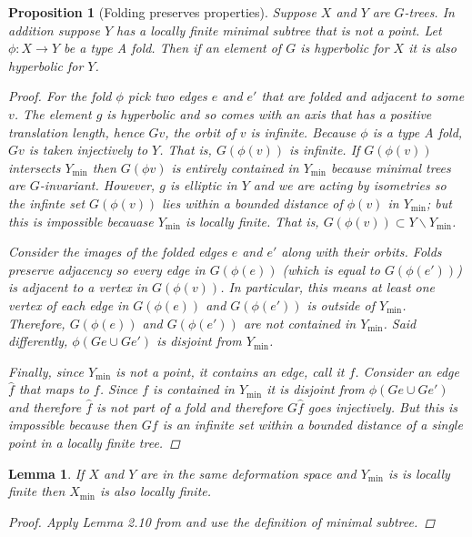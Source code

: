 \documentclass[12pt,parskip=full]{report}
\theoremstyle{plain}
\newtheorem{lem}[thm]{Lemma}
\newtheorem{prop}[thm]{Proposition}
\theoremstyle{definition}
\begin{document}
\begin{prop}
    [Folding preserves properties]
    \label{lem:foldingpreserveshyp}
    Suppose $X$ and $Y$ are $G$-trees. In addition suppose $Y$ has a locally finite minimal subtree that is not a point. Let $\phi:X\to Y$ be a type A fold. Then if an element of $G$ is hyperbolic for $X$ it is also hyperbolic for $Y$.
    
    \begin{proof}
        For the fold $\phi$ pick two edges $e$ and $e'$ that are folded and adjacent to some $v$. The element $g$ is hyperbolic and so comes with an axis that has a positive translation length, hence $Gv$, the orbit of $v$ is infinite. Because $\phi$ is a type A fold, $G v$ is taken injectively to $Y$. That is, $G(\phi (v))$ is infinite. If $G(\phi (v))$ intersects $Y_\text{min}$ then $G(\phi v)$ is entirely contained in $Y_\text{min}$ because minimal trees are $G$-invariant. However, $g$ is elliptic in $Y$ and we are acting by isometries so the infinte set $G(\phi (v))$ lies within a bounded distance of $\phi (v)$ in $Y_\text{min}$; but this is impossible becauase $Y_\text{min}$ is locally finite. That is, $G(\phi (v))\subset Y\smallsetminus Y_\text{min}$. 
        
        Consider the images of the folded edges $e$ and $e'$ along with their orbits. 
        Folds preserve adjacency so every edge in $G(\phi (e))$ (which is equal to $G(\phi (e'))$) is adjacent to a vertex in $G( \phi (v))$. In particular, this means at least one vertex of each edge in $G(\phi (e))$ and $G(\phi (e'))$ is outside of $Y_\text{min}$. 
        Therefore, $G(\phi (e))$ and $G(\phi (e'))$ are not contained in $Y_\text{min}$. 
        Said differently, $\phi( Ge\cup Ge')$ is disjoint from $Y_\text{min}$.
        
        Finally, since $Y_\text{min}$ is not a point, it contains an edge, call it $f$. Consider an edge $\hat{f}$ that maps to $f$. Since $f$ is contained in $Y_\text{min}$ it is disjoint from $\phi( Ge\cup Ge')$ and therefore $\hat{f}$ is not part of a fold and therefore \(G\hat{f}\) goes injectively. But this is impossible because then $Gf$ is an infinite set within a bounded distance of a single point in a locally finite tree.
    \end{proof}
\end{prop}

\begin{lem}
    \label{lem:pullbacklocallyfinite}
    If \(X\) and \(Y\) are in the same deformation space and \(Y_\text{min}\) is is locally finite then \(X_\text{min}\) is also locally finite.
    \begin{proof}
        Apply Lemma 2.10 from \cite{draftpaper} and use the definition of minimal subtree.
    \end{proof}
\end{lem}
\end{document}

